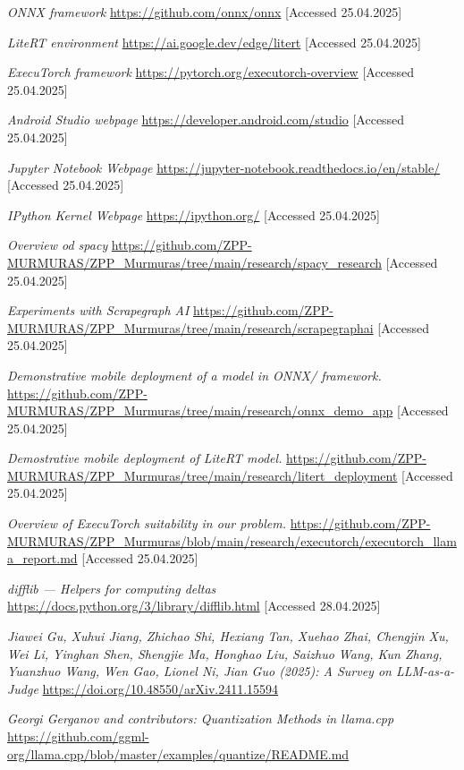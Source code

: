 \documentclass[licencjacka,en]{pracamgr}
\begin{document}
\begin{thebibliography}{99}
\textit{ONNX framework}
\url{https://github.com/onnx/onnx}
[Accessed 25.04.2025]

\textit{LiteRT environment}
\url{https://ai.google.dev/edge/litert}
[Accessed 25.04.2025]

\textit{ExecuTorch framework}
\url{https://pytorch.org/executorch-overview}
[Accessed 25.04.2025]

\textit{Android Studio webpage}
\url{https://developer.android.com/studio}
[Accessed 25.04.2025]

\textit{Jupyter Notebook Webpage}
\url{https://jupyter-notebook.readthedocs.io/en/stable/}
[Accessed 25.04.2025]

\textit{IPython Kernel Webpage}
\url{https://ipython.org/}
[Accessed 25.04.2025]

\textit{Overview od spacy}
\url{https://github.com/ZPP-MURMURAS/ZPP_Murmuras/tree/main/research/spacy_research}
[Accessed 25.04.2025]

\textit{Experiments with Scrapegraph AI}
\url{https://github.com/ZPP-MURMURAS/ZPP_Murmuras/tree/main/research/scrapegraphai}
[Accessed 25.04.2025]

\textit{Demonstrative mobile deployment of a model in ONNX/ framework.}
\url{https://github.com/ZPP-MURMURAS/ZPP_Murmuras/tree/main/research/onnx_demo_app}
[Accessed 25.04.2025]

\textit{Demostrative mobile deployment of LiteRT model.}
\url{https://github.com/ZPP-MURMURAS/ZPP_Murmuras/tree/main/research/litert_deployment}
[Accessed 25.04.2025]

\textit{Overview of ExecuTorch suitability in our problem.}
\url{https://github.com/ZPP-MURMURAS/ZPP_Murmuras/blob/main/research/executorch/executorch_llama_report.md}
[Accessed 25.04.2025]

\textit{difflib --- Helpers for computing deltas}
\url{https://docs.python.org/3/library/difflib.html}
[Accessed 28.04.2025]

\textit{Jiawei Gu, Xuhui Jiang, Zhichao Shi, Hexiang Tan, Xuehao Zhai, Chengjin Xu, Wei Li, Yinghan Shen, Shengjie Ma, Honghao Liu, Saizhuo Wang, Kun Zhang, Yuanzhuo Wang, Wen Gao, Lionel Ni, Jian Guo (2025): A Survey on LLM-as-a-Judge}
\url{https://doi.org/10.48550/arXiv.2411.15594}

\textit{Georgi Gerganov and contributors: Quantization Methods in llama.cpp}
\url{https://github.com/ggml-org/llama.cpp/blob/master/examples/quantize/README.md}


\end{thebibliography}
\end{document}
